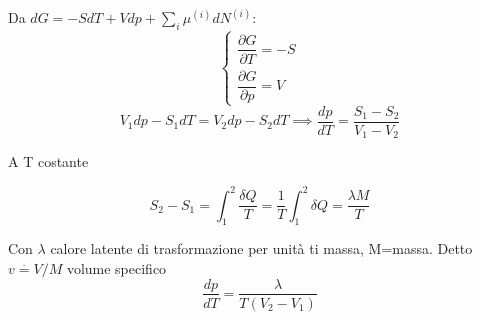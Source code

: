 \documentclass[a4paper,11pt]{report}
\newcommand{\defeq}{\overset{\cdot}{=}}
\begin{document}
		Da $dG = -SdT + Vdp + \sum_i \mu^{(i)} dN^{(i)}$:
		$$
		\left\{\begin{matrix}
		\dfrac{\partial G}{\partial T} = -S \\ 
		\dfrac{\partial G}{\partial p} = V 
		\end{matrix}\right.
		$$
		\begin{equation}
			V_1 dp -S_1 dT = V_2 dp - S_2 dT \implies \dfrac{dp}{dT} = \dfrac{S_1 - S_2}{V_1 - V_2}
		\end{equation}
		
		A T costante
		
		\begin{equation}
			S_2 - S_1 = \int_{1}^{2}\dfrac{\delta Q}{T} = \dfrac{1}{T} \int_{1}^{2} \delta Q = \dfrac{\lambda M}{T}
		\end{equation}
		
		Con $\lambda$ calore latente di trasformazione per unità ti massa, M=massa. Detto $v \defeq V/M$ volume specifico
		\begin{equation}
			\dfrac{dp}{dT} = \dfrac{\lambda}{T(V_2 - V_1)}
		\end{equation}
	
\end{document}
